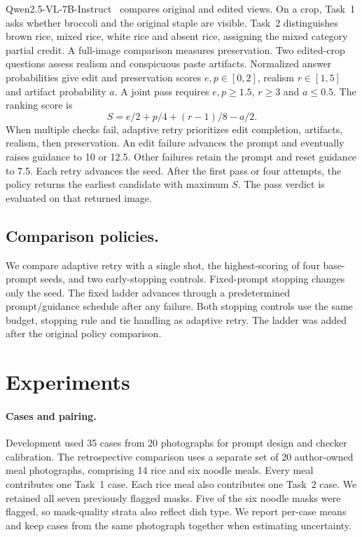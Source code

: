 Qwen2.5-VL-7B-Instruct~\cite{bai2025qwen25vl} compares original and edited views. On a crop, Task~1 asks whether broccoli and the original staple are visible. Task~2 distinguishes brown rice, mixed rice, white rice and absent rice, assigning the mixed category partial credit. A full-image comparison measures preservation. Two edited-crop questions assess realism and conspicuous paste artifacts. Normalized answer probabilities give edit and preservation scores $e,p\in[0,2]$, realism $r\in[1,5]$ and artifact probability $a$. A joint pass requires $e,p\geq1.5$, $r\geq3$ and $a\leq0.5$. The ranking score is
\[
S=e/2+p/4+(r-1)/8-a/2.
\]
When multiple checks fail, adaptive retry prioritizes edit completion, artifacts, realism, then preservation. An edit failure advances the prompt and eventually raises guidance to 10 or 12.5. Other failures retain the prompt and reset guidance to 7.5. Each retry advances the seed. After the first pass or four attempts, the policy returns the earliest candidate with maximum $S$. The pass verdict is evaluated on that returned image.

\subsection{Comparison policies.}

We compare adaptive retry with a single shot, the highest-scoring of four base-prompt seeds, and two early-stopping controls. Fixed-prompt stopping changes only the seed. The fixed ladder advances through a predetermined prompt/guidance schedule after any failure. Both stopping controls use the same budget, stopping rule and tie handling as adaptive retry. The ladder was added after the original policy comparison.

\section{Experiments}

\paragraph{Cases and pairing.} Development used 35 cases from 20 photographs for prompt design and checker calibration. The retrospective comparison uses a separate set of 20 author-owned meal photographs, comprising 14 rice and six noodle meals. Every meal contributes one Task~1 case. Each rice meal also contributes one Task~2 case. We retained all seven previously flagged masks. Five of the six noodle masks were flagged, so mask-quality strata also reflect dish type. We report per-case means and keep cases from the same photograph together when estimating uncertainty.

